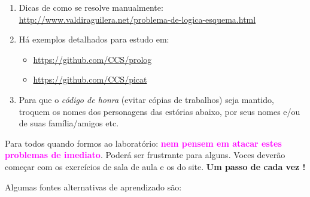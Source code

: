 \documentclass[a4paper,12pt]{article}
\begin{document}
\begin{enumerate}
\setlength\itemsep{0.1cm}
\item Dicas de como se resolve manualmente:\\
\url{http://www.valdiraguilera.net/problema-de-logica-esquema.html}

\item Há exemplos detalhados para estudo em:
\begin{itemize}
  \item  \url{https://github.com/CCS/prolog} 
  \item  \url{https://github.com/CCS/picat}
\end{itemize}




\item Para que o \textit{código de honra} (evitar cópias de trabalhos) seja mantido, troquem os nomes dos personagens das estórias abaixo, por seus nomes e/ou de suas família/amigos etc. 

\end{enumerate}

\newpage

\begin{center}

\vskip 2cm
{\Large
Para todos quando formos ao laboratório: \textbf{\textcolor{magenta}{nem pensem em atacar estes problemas de imediato}}. Poderá ser frustrante para alguns. Voces deverão começar com os exercícios de sala de aula e os do site. \textbf{Um passo de cada vez !}
}
\vskip 2cm
\end{center}

Algumas fontes alternativas de aprendizado s\~ao:
\end{document}
